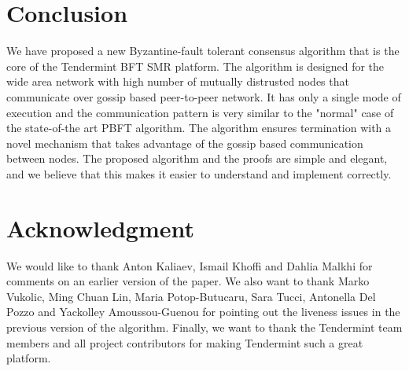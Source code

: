 \section{Conclusion} \label{sec:conclusion}

We have proposed a new Byzantine-fault tolerant consensus algorithm that is the
core of the Tendermint BFT SMR platform. The algorithm is designed for the wide
area network with high number of mutually distrusted nodes that communicate
over gossip based peer-to-peer network. It has only a single mode of execution
and the communication pattern is very similar to the "normal" case of the
state-of-the art PBFT algorithm. The algorithm ensures termination with a novel
mechanism that takes advantage of the gossip based communication between nodes.
The proposed algorithm and the proofs are simple and elegant, and we believe
that this makes it easier to understand and implement correctly.   

\section*{Acknowledgment}

We would like to thank Anton Kaliaev, Ismail Khoffi and Dahlia Malkhi for comments on an earlier version of the paper. We also want to thank Marko Vukolic, Ming Chuan Lin, Maria Potop-Butucaru, Sara Tucci, Antonella Del Pozzo and Yackolley Amoussou-Guenou for pointing out the liveness issues
in the previous version of the algorithm. Finally, we want to thank the Tendermint team members and all project contributors for making Tendermint such a great platform.  
